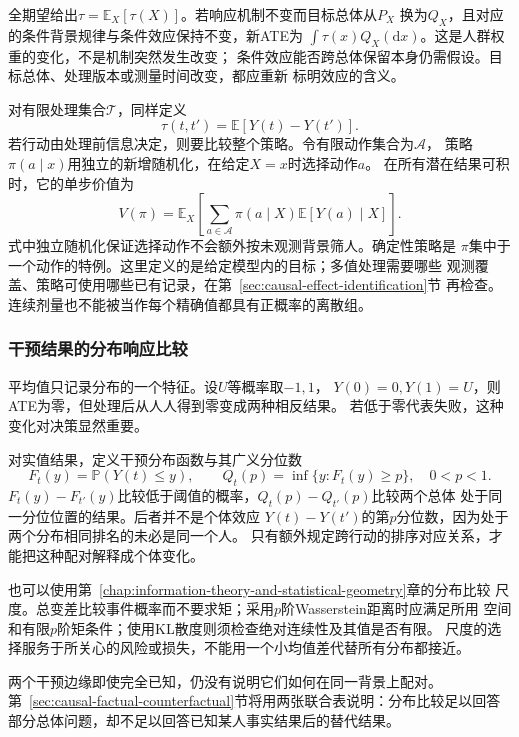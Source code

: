 全期望给出\(\tau=\mathbb E_X[\tau(X)]\)。若响应机制不变而目标总体从\(P_X\)
换为\(Q_X\)，且对应的条件背景规律与条件效应保持不变，新ATE为
\(\int\tau(x)Q_X(\mathrm dx)\)。这是人群权重的变化，不是机制突然发生改变；
条件效应能否跨总体保留本身仍需假设。目标总体、处理版本或测量时间改变，都应重新
标明效应的含义。

对有限处理集合\(\mathcal T\)，同样定义
\[
  \tau(t,t')=\mathbb E[Y(t)-Y(t')].
\]
若行动由处理前信息决定，则要比较整个策略。令有限动作集合为\(\mathcal A\)，
策略\(\pi(a\mid x)\)用独立的新增随机化，在给定\(X=x\)时选择动作\(a\)。
在所有潜在结果可积时，它的单步价值为
\begin{equation}
  V(\pi)=\mathbb E_X\left[
    \sum_{a\in\mathcal A}\pi(a\mid X)\mathbb E[Y(a)\mid X]
  \right].
  \label{eq:causal-policy-value}
\end{equation}
式中独立随机化保证选择动作不会额外按未观测背景筛人。确定性策略是
\(\pi\)集中于一个动作的特例。这里定义的是给定模型内的目标；多值处理需要哪些
观测覆盖、策略可使用哪些已有记录，在第~\ref{sec:causal-effect-identification}节
再检查。连续剂量也不能被当作每个精确值都具有正概率的离散组。

\subsubsection{干预结果的分布响应比较}
\label{sec:causal-distribution-response}

平均值只记录分布的一个特征。设\(U\)等概率取\(-1,1\)，
\(Y(0)=0,Y(1)=U\)，则ATE为零，但处理后从人人得到零变成两种相反结果。
若低于零代表失败，这种变化对决策显然重要。

对实值结果，定义干预分布函数与其广义分位数
\[
  F_t(y)=\mathbb P(Y(t)\leq y),\qquad
  Q_t(p)=\inf\{y:F_t(y)\geq p\},\quad 0<p<1.
\]
\(F_t(y)-F_{t'}(y)\)比较低于阈值的概率，\(Q_t(p)-Q_{t'}(p)\)比较两个总体
处于同一分位位置的结果。后者并不是个体效应
\(Y(t)-Y(t')\)的第\(p\)分位数，因为处于两个分布相同排名的未必是同一个人。
只有额外规定跨行动的排序对应关系，才能把这种配对解释成个体变化。

也可以使用第~\ref{chap:information-theory-and-statistical-geometry}章的分布比较
尺度。总变差比较事件概率而不要求矩；采用\(p\)阶Wasserstein距离时应满足所用
空间和有限\(p\)阶矩条件；使用KL散度则须检查绝对连续性及其值是否有限。
尺度的选择服务于所关心的风险或损失，不能用一个小均值差代替所有分布都接近。

两个干预边缘即使完全已知，仍没有说明它们如何在同一背景上配对。
第~\ref{sec:causal-factual-counterfactual}节将用两张联合表说明：分布比较足以回答
部分总体问题，却不足以回答已知某人事实结果后的替代结果。

